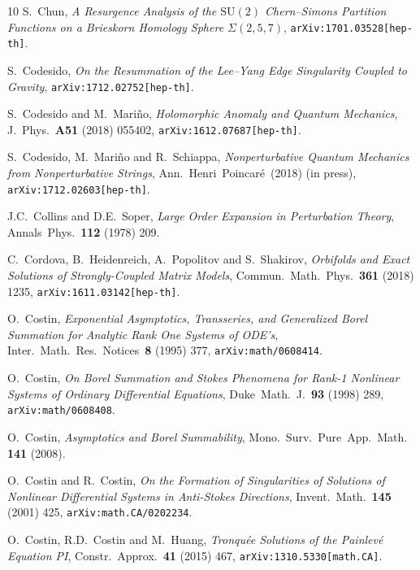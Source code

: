 \documentclass[11pt,a4paper]{article}
\begin{document}
\begin{thebibliography}{10}
S.~Chun,
\textit{A Resurgence Analysis of the $\text{SU}(2)$ Chern--Simons Partition Functions on a Brieskorn Homology Sphere $\Sigma(2,5,7)$},
\texttt{arXiv:1701.03528[hep-th]}.

S.~Codesido,
\textit{On the Resummation of the Lee--Yang Edge Singularity Coupled to Gravity},
\texttt{arXiv:1712.02752[hep-th]}.

S.~Codesido and M.~Mari\~no,
\textit{Holomorphic Anomaly and Quantum Mechanics},
J.\ Phys.\ \textbf{A51} (2018) 055402,
\texttt{arXiv:1612.07687[hep-th]}.

S.~Codesido, M.~Mari\~no and R.~Schiappa,
\textit{Nonperturbative Quantum Mechanics from Nonperturbative Strings},
Ann.\ Henri\ Poincar\'e\ (2018) (in press),
\texttt{arXiv:1712.02603[hep-th]}.

J.C.~Collins and D.E.~Soper,
\textit{Large Order Expansion in Perturbation Theory},
Annals\ Phys.\ \textbf{112} (1978) 209.

C.~Cordova, B.~Heidenreich, A.~Popolitov and S.~Shakirov,
\textit{Orbifolds and Exact Solutions of Strongly-Coupled Matrix Models},
Commun.\ Math.\ Phys.\ \textbf{361} (2018) 1235,
\texttt{arXiv:1611.03142[hep-th]}.

O.~Costin,
\textit{Exponential Asymptotics, Transseries, and Generalized Borel Summation for Analytic Rank One Systems of ODE's},
Inter.\ Math.\ Res.\ Notices\ \textbf{8} (1995) 377,
\texttt{arXiv:math/0608414}.

O.~Costin,
\textit{On Borel Summation and Stokes Phenomena for Rank-1 Nonlinear Systems of Ordinary Differential Equations},
Duke\ Math.\ J.\ \textbf{93} (1998) 289,
\texttt{arXiv:math/0608408}.

O.~Costin,
\textit{Asymptotics and Borel Summability},
Mono.\ Surv.\ Pure\ App.\ Math. \textbf{141} (2008).

O.~Costin and R.~Costin,
\textit{On the Formation of Singularities of Solutions of Nonlinear Differential Systems in Anti-Stokes Directions}, 
Invent.\ Math.\ \textbf{145} (2001) 425,
\texttt{arXiv:math.CA/0202234}.

O.~Costin, R.D.~Costin and M.~Huang,
\textit{Tronqu\'ee Solutions of the Painlev\'e Equation PI},
Constr.\ Approx.\ \textbf{41} (2015) 467,
\texttt{arXiv:1310.5330[math.CA]}.


\end{thebibliography}
\end{document}
